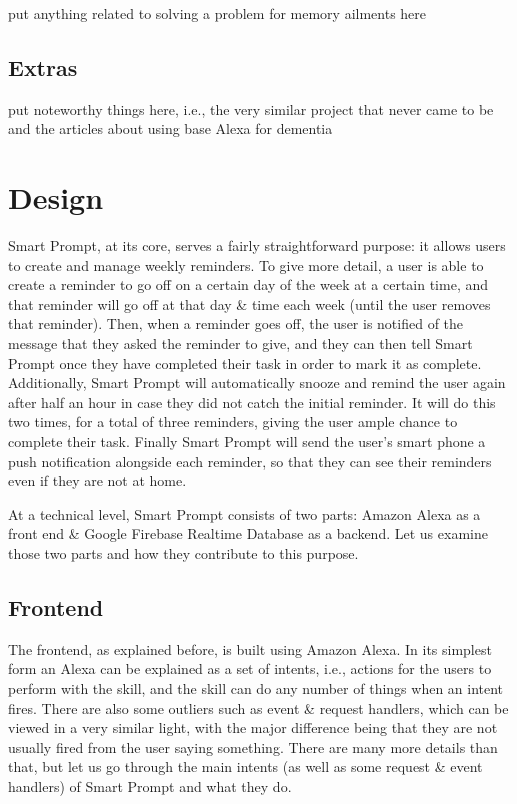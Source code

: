 \documentclass[conference]{IEEEtran}
\begin{document}
put anything related to solving a problem for memory ailments here

\subsection{Extras}

put noteworthy things here, i.e., the very similar project that never came to be and the articles about using base Alexa for dementia


\section{Design}

Smart Prompt, at its core, serves a fairly straightforward purpose: it allows users to create and manage weekly reminders. 
To give more detail, a user is able to create a reminder to go off on a certain day of the week at a certain time, and that reminder will go off at that day \& time each week (until the user removes that reminder). 
Then, when a reminder goes off, the user is notified of the message that they asked the reminder to give, and they can then tell Smart Prompt once they have completed their task in order to mark it as complete. 
Additionally, Smart Prompt will automatically snooze and remind the user again after half an hour in case they did not catch the initial reminder. 
It will do this two times, for a total of three reminders, giving the user ample chance to complete their task. 
Finally Smart Prompt will send the user's smart phone a push notification alongside each reminder, so that they can see their reminders even if they are not at home. 

At a technical level, Smart Prompt consists of two parts: Amazon Alexa as a front end \& Google Firebase Realtime Database as a backend. 
Let us examine those two parts and how they contribute to this purpose. 

\subsection{Frontend}

The frontend, as explained before, is built using Amazon Alexa. 
In its simplest form an Alexa can be explained as a set of intents, i.e., actions for the users to perform with the skill, and the skill can do any number of things when an intent fires. 
There are also some outliers such as event \& request handlers, which can be viewed in a very similar light, with the major difference being that they are not usually fired from the user saying something. 
There are many more details than that, but let us go through the main intents (as well as some request \& event handlers) of Smart Prompt and what they do. 
\end{document}

